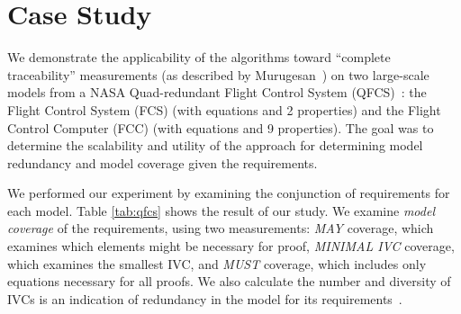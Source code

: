 \section{Case Study}

\label{sec:qfc}
We demonstrate the applicability of the algorithms toward ``complete traceability'' measurements (as described by Murugesan~\cite{Murugesan16:renext}) on two large-scale models from a NASA Quad-redundant Flight Control System (QFCS)~\cite{NFM2015:backes}: the Flight Control System (FCS) (with  equations and 2 properties) and the Flight Control Computer (FCC) (with  equations and 9 properties).  The goal was to determine the scalability and utility of the approach for determining model redundancy and model coverage given the requirements.

We performed our experiment by examining the conjunction of requirements for each model. Table \ref{tab:qfcs} shows the result of our study.  We examine {\em model coverage} of the requirements, using two measurements: {\em MAY} coverage, which examines which elements might be necessary for proof, {\em MINIMAL IVC} coverage, which examines the smallest IVC, and {\em MUST} coverage, which includes only equations necessary for all proofs.  We also calculate the number and diversity of IVCs is an indication of redundancy in the model for its requirements~. 


\iffalse
For each model. when the \aivcalg\ did not terminate before 4 hours, its runtime is shown with incomplete. \ela{we can explain a bit the numbers and table here, then get to coverage}

As mentioned in Section~\ref{sec:intro}, proof-based coverage analysis is one important application of all minimal IVCs. The goal of a
coverage metric is usually to assign a numeric score that de-
scribes how well properties cover the design. The majority of
the work on coverage metrics has focused on mutations, which
are “atomic” changes to the design, where the set of possible
mutations depends on the notation that is used. For large models, mutation-based coverage is quite inefficient. Having all minimal IVCs, we can easily formalize a family of proof-based metrics. For example, owe could define two distinct coverage metrics as follows:
\ela{choose two metric that I can calculate: we could choose must and may since you also talk about them in the introduction}
\fi

